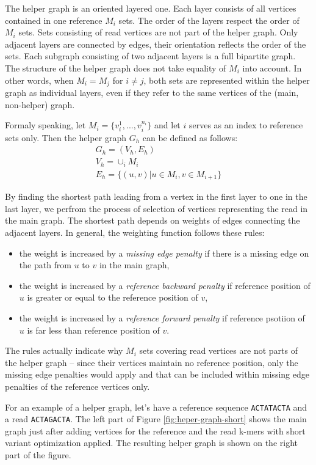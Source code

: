 The helper graph is an oriented layered one. Each layer consists of all vertices contained in one reference $M_i$ sets. The order of the layers respect the order of $M_i$ sets. Sets consisting of read vertices are not part of the helper graph. Only adjacent layers are connected by edges, their orientation reflects the order of the sets. Each subgraph consisting of two adjacent layers is a full bipartite graph. The structure of the helper graph does not take equality of $M_i$ into account. In other words, when $M_i = M_j$ for $i \ne j$, both sets are represented within the helper graph as individual layers, even if they refer to the same vertices of the (main, non-helper) graph.

Formaly speaking, let $M_i = \{v_{i}^{1}, ..., v_{i}^{n_i}\}$ and let $i$ serves as an index to reference sets only. Then the helper graph $G_h$ can be defined as follows:
\begin{gather}
G_h = (V_h, E_h) \\
V_h = \cup_i M_i \\
E_h = \{(u, v) | u \in M_i, v \in M_{i + 1}\}
\end{gather}

By finding the shortest path leading from a vertex in the first layer to one in the last layer, we perfrom the process of selection of vertices representing the read in the main graph. The shortest path depends on weights of edges connecting the adjacent layers. In general, the weighting function follows these rules:
\begin{itemize}
\item the weight is increased by a \textit{missing edge penalty} if there is a missing edge on the path from $u$ to $v$ in the main graph,
\item the weight is increased by a \textit{reference backward penalty} if reference position of $u$ is greater or equal to the reference position of $v$,
\item the weight is increased by a \textit{reference forward penalty} if reference psotiion of $u$ is far less than reference position of $v$.
\end{itemize}
The rules actually indicate why $M_i$ sets covering read vertices are not parts of the helper graph – since their vertices maintain no reference position, only the missing edge penalties would apply and that can be included within missing edge penalties of the reference vertices only.

For an example of a helper graph, let's have a reference sequence \texttt{ACTATACTA} and a read \texttt{ACTAGACTA}. The left part of Figure \ref{fig:heper-graph-short} shows the main graph just after adding vertices for the reference and the read k-mers with short variant optimization applied. The resulting helper graph is shown on the right part of the figure.

